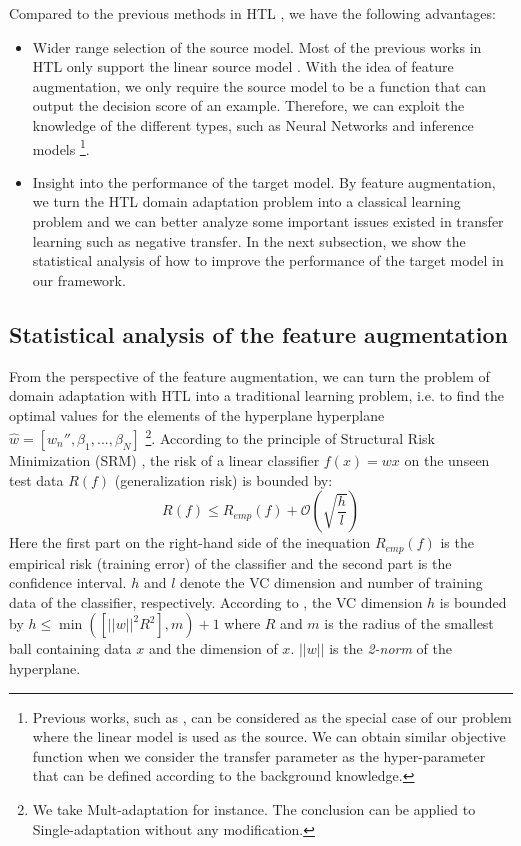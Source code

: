 Compared to the previous methods in HTL \cite{tommasi2014learning} \cite{aytar2011tabula}, we have the following advantages:
\begin{itemize}
	\item Wider range selection of the source model. Most of the previous works in HTL only support the linear source model \cite{tommasi2014learning} \cite{aytar2011tabula}. With the idea of feature augmentation, we only require the source model to be a function that can output the decision score of an example. Therefore, we can exploit the knowledge of the different types, such as Neural Networks and inference models \footnote{Previous works, such as \cite{tommasi2014learning} \cite{aytar2011tabula}, can be considered as the special case of our problem where the linear model is used as the source. We can obtain similar objective function when we consider the transfer parameter as the hyper-parameter that can be defined according to the background knowledge.}.
	\item Insight into the performance of the target model. By feature augmentation, we turn the HTL domain adaptation problem into a classical learning problem and we can better analyze some important issues existed in transfer learning such as negative transfer. In the next subsection, we show the statistical analysis of how to improve the performance of the target model in our framework. 
\end{itemize}

\subsection{Statistical analysis of the feature augmentation}
From the perspective of the feature augmentation, we can turn the problem of domain adaptation with HTL into a traditional learning problem, i.e. to find the optimal values for the elements of the hyperplane hyperplane $\hat{w}=[w_{n}'',\beta_1,...,\beta_N]$ \footnote{We take Mult-adaptation for instance. The conclusion can be applied to Single-adaptation without any modification.}. According to the principle of Structural Risk Minimization (SRM) \cite{vapnik1999overview}, the risk of a linear classifier $f(x)=wx$ on the unseen test data $R(f)$ (generalization risk) is bounded by:
\begin{equation}\label{eq:srm}
R(f) \le {R_{emp}}(f) + \mathcal{O}\left(\sqrt{\frac{h}{l}}\right)%
\end{equation}
Here the first part on the right-hand side of the inequation ${R_{emp}}(f)$ is the empirical risk (training error) of the classifier and the second part is the confidence interval. $h$ and $l$ denote the VC dimension and number of training data of the classifier, respectively. According to \cite{suykens1999least}, the VC dimension $h$ is bounded by $h \le \min([||w||^2R^2],m)+1$ where $R$ and $m$ is the radius of the smallest ball containing data $x$ and the dimension of $x$. $||w||$ is the \textit{2-norm} of the hyperplane.

